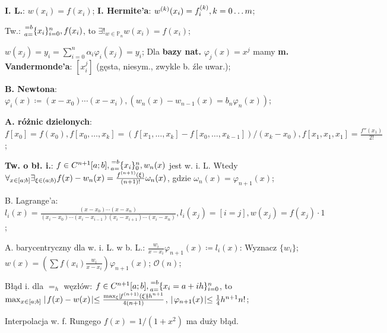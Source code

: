 
\entry
\textbf{I. L.}:
$w(x_i) = f(x_i)$;
\entry
\textbf{I. Hermite'a}:
$w^{(k)}(x_i) = f^{(k)}_i, k = 0 \ldots m$;

\entry
Tw.:
$\ipoints[i=0][n][a=][=b]{x_i}, f(x_i)$,
to
$\exists!_{w \in \mathbb{P}_n} w(x_i)=f(x_i)$;

\entry
$w(x_j) = y_i = \sum_{i=0}^n\alpha_i\varphi_i(x_j) = y_i$;
\entry
Dla \textbf{bazy nat.}
$\varphi_j(x)=x^j$
mamy \textbf{m. Vandermonde'a}:
$[x^j_i]$
(gęsta, niesym., zwykle b. źle uwar.);

\entry
\textbf{B. Newtona}:
$\varphi_i(x) \coloneqq (x-x_0)\cdots(x-x_i),
(w_n(x)-w_{n-1}(x) = b_n\varphi_n(x))$;

\entry
\textbf{A. różnic dzielonych}:
$
f[x_0] = f(x_0),
f[x_0,\ldots,x_k] = (f[x_1,\ldots,x_k] - f[x_0,\ldots,x_{k-1}])/(x_k - x_0),
f[x_1, x_1, x_1] = \frac{f''(x_1)}{2!}
$;


\textbf{Tw. o bł. i.}:
$f\in C^{n+1}[a;b], \ipoints[0][n][a=][=b]{x_i}, w_n(x)$ jest w. i. L.
Wtedy
$\forall_{x \in [a;b]} \exists_{\xi \in (a;b)} f(x) - w_n(x) = \frac{f^{(n+1)}(\xi)}{(n+1)!}\omega_n(x)$,
gdzie $\omega_n(x)=\varphi_{n+1}(x)$;


\entry
B. Lagrange'a:
$
l_i(x) = \frac{(x-x_0)\cdots(x-x_n)}{(x_i - x_0)\cdots(x_i - x_{i-1})(x_i - x_{i+1}) \cdots (x_i - x_n)},
l_i(x_j) = [i=j],
w(x_j)=f(x_j)\cdot 1
$;

\entry
A. barycentryczny dla w. i. L. w b. L.:
$\frac{w_i}{x - x_i}\varphi_{n+1}(x) \coloneqq l_i(x)$:
Wyznacz
$\{w_i\}$;
$w(x) = (\sum f(x_i)\frac{w_i}{x - x_i})\varphi_{n+1}(x)$;
$\mathcal{O}(n)$;

\entry
Błąd i. dla $=_h$ węzłów:
$f \in C^{n+1}[a;b], \ipoints[i=0][n][a=][=b]{x_i=a+ih}$, to
$\max_{x \in [a;b]}\mid\! f(x)-w(x)\! \mid \leq \frac{\max_\xi\mid\! f^{(n+1)}(\xi)\! \mid h^{n+1}}{4(n+1)}$,
$\mid\! \varphi_{n+1}(x)\! \mid \leq \frac{1}{4} h^{n+1} n!$;

\entry
Interpolacja w. f. Rungego
$f(x)=1/(1+x^2)$
ma duży błąd.
